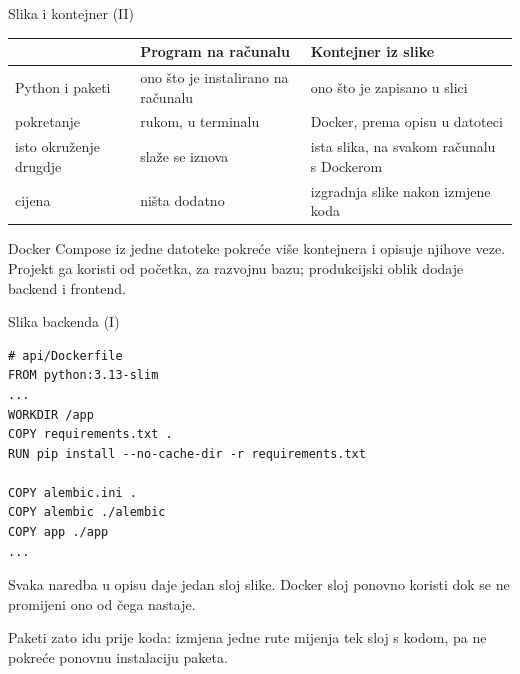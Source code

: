\begin{frame}{Slika i kontejner (II)}
\vspace{0.3em}
\begin{center}
{\small
\setlength{\tabcolsep}{6pt}
\renewcommand{\arraystretch}{1.35}
\begin{tabular}{@{}L{3.0cm}L{3.9cm}L{4.4cm}@{}}
  \toprule
   & \textbf{Program na računalu} & \textbf{Kontejner iz slike} \\
  \midrule
  Python i paketi & ono što je instalirano na računalu & ono što je zapisano u slici \\
  pokretanje & rukom, u terminalu & Docker, prema opisu u datoteci \\
  isto okruženje drugdje & slaže se iznova & ista slika, na svakom računalu s Dockerom \\
  cijena & ništa dodatno & izgradnja slike nakon izmjene koda \\
  \bottomrule
\end{tabular}
}
\end{center}

\vspace{0.6em}
Docker Compose iz jedne datoteke pokreće više kontejnera i opisuje njihove veze. Projekt ga koristi od početka, za razvojnu bazu; produkcijski oblik dodaje backend i frontend.
\end{frame}

\begin{frame}[fragile]{Slika backenda (I)}
\begin{lstlisting}
# api/Dockerfile
FROM python:3.13-slim
...
WORKDIR /app
COPY requirements.txt .
RUN pip install --no-cache-dir -r requirements.txt

COPY alembic.ini .
COPY alembic ./alembic
COPY app ./app
...
\end{lstlisting}

\vspace{0.3em}
Svaka naredba u opisu daje jedan sloj slike. Docker sloj ponovno koristi dok se ne promijeni ono od čega nastaje.

\vspace{0.3em}
Paketi zato idu prije koda: izmjena jedne rute mijenja tek sloj s kodom, pa ne pokreće ponovnu instalaciju paketa.
\end{frame}

